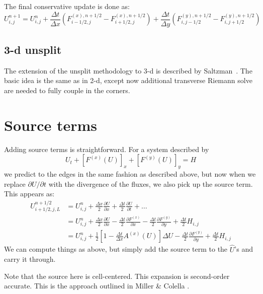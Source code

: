 The final conservative update is done as:
\begin{equation}
U^{n+1}_{i,j} = U^n_{i,j}
   + \frac{\Delta t}{\Delta x} \left ( F^{(x),n+1/2}_{i-1/2,j} - F^{(x),n+1/2}_{i+1/2,j} \right )
   + \frac{\Delta t}{\Delta y} \left ( F^{(y),n+1/2}_{i,j-1/2} - F^{(y),n+1/2}_{i,j+1/2} \right )
\end{equation}



\subsection{3-d unsplit}

The extension of the unsplit methodology to 3-d is described by
Saltzman~\cite{saltzman:1994}.  The basic idea is the same as in 2-d,
except now additional transverse Riemann solve are needed to fully
couple in the corners.


\section{Source terms}
\label{euler:sec:sourceterms}

Adding source terms is straightforward.  For
a system described by
\begin{equation}
U_t + [F^{(x)}(U)]_x + [F^{(y)}(U)]_y = H
\end{equation}
we predict to the edges in the same fashion as described above, but now
when we replace $\partial U/\partial t$ with the divergence of the
fluxes, we also pick up the source term.  This appears as:
\begin{align}
U_{i+1/2,j,L}^{n+1/2} &= U_{i,j}^n
            + \frac{\Delta x}{2} \frac{\partial U}{\partial x}
            + \frac{\Delta t}{2} \frac{\partial U}{\partial t} + \ldots \\
&= U_{i,j}^n + \frac{\Delta x}{2} \frac{\partial U}{\partial x}
              - \frac{\Delta t}{2} \frac{\partial F^{(x)}}{\partial x}
              - \frac{\Delta t}{2} \frac{\partial F^{(y)}}{\partial y}
              + \frac{\Delta t}{2} H_{i,j} \\
&= U_{i,j}^n
 + \frac{1}{2} \left [1 -\frac{\Delta t}{\Delta x} A^{(x)}(U)\right ] \Delta U
 - \frac{\Delta t}{2} \frac{\partial F^{(y)}}{\partial y}
 + \frac{\Delta t}{2} H_{i,j}
  \label{eq:Utaylorstatesource}
\end{align}
We can compute things as above, but simply add the source term to the
$\hat{U}$'s and carry it through.

Note that the source here is cell-centered.  This expansion is
second-order accurate.  This is the approach outlined in Miller
\& Colella \cite{millercolella:2002}.

